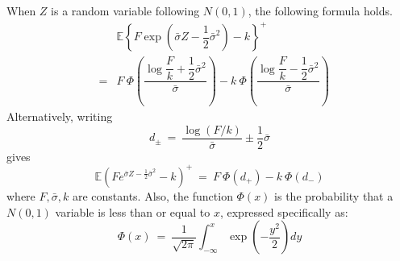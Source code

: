 \documentclass[uplatex,a4j,12pt,dvipdfmx]{jsarticle}
\begin{document}
When $Z$ is a random variable following $N(0,1)$, the following formula holds.
%
%
\begin{eqnarray*}
	&&
	\mathbb{E}
	\left\{
	F
	\exp
	\left(
	\bar{\sigma} Z - \dfrac{1}{2} \bar{\sigma}^{2}
	\right)
	-k
	\right\}^{+}
	\\ &=&
	F
	\ \! \Phi
	\left(
	\dfrac{
		\log \dfrac{F}{k} + \dfrac{1}{2} \bar{\sigma}^{2}
	}
	{\bar{\sigma}}
	\right)
	-
	k
	\ \! \Phi
	\left(
	\dfrac{
		\log \dfrac{F}{k} - \dfrac{1}{2} \bar{\sigma}^{2}
	}
	{\bar{\sigma}}
	\right)
\end{eqnarray*}
%
%
Alternatively, writing
$$
	d_{\pm}
	\ = \
	\dfrac{
		\log (F/k)
	}
	{\bar{\sigma}}
	\pm \dfrac{1}{2} \bar{\sigma}
$$
gives
$$
	\mathbb{E}
	\left(
	F e^{\bar{\sigma}Z - \frac{1}{2} \bar{\sigma}^{2} }
	-
	k
	\right)^{+}
	\ = \
	F
	\ \! \Phi
	\left(
	d_{+}
	\right)
	-
	k
	\ \! \Phi
	\left(
	d_{-}
	\right)
$$
where $F,\bar{\sigma},k$ are constants. Also, the function $\Phi(x)$ is the probability that a $N(0,1)$ variable is less than or equal to $x$, expressed specifically as:
$$
	\Phi(x)
	\ = \
	\dfrac{1}{\sqrt{2 \pi}}
	\int^{x}_{- \infty} \exp \left( - \dfrac{y^{2}}{2} \right) dy
$$

${}$
\end{document}
